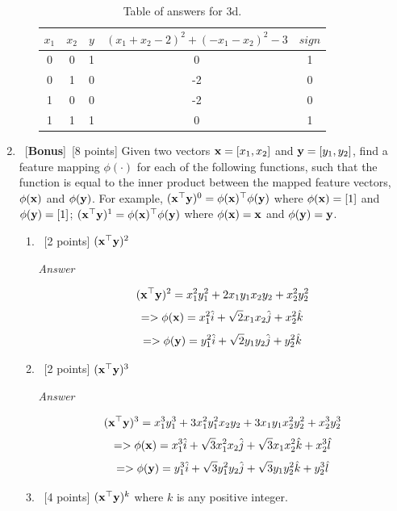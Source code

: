 \documentclass[12pt, fullpage,letterpaper]{article}
\begin{document}
\begin{enumerate}
\begin{enumerate}
		\begin{table}
        	\centering
        	\begin{tabular}{cccc|c}
        		$x_1 $ & $x_2$ & $y$ & $(x_1+x_2-2)^2+(-x_1-x_2)^2-3$ & $sign$\\ 
        		\hline\hline
        		0 & 0 & 1 &  0 & 1 \\ \hline
        		0 & 1 & 0 & -2 & 0 \\ \hline
        		1 & 0 & 0 & -2 & 0 \\ \hline
        		1 & 1 & 1 &  0 & 1 \\ \hline
        	\end{tabular}
        	\caption{Table of answers for 3d.}\label{tb:1}
        \end{table}
	\end{enumerate}
		
	
	\item~[\textbf{Bonus}]~[8 points]  Given two vectors ${\bf x} = [x_1,  x_2]$ and ${\bf y}=[y_1,  y_2]$, find a feature mapping $\phi(\cdot)$ for each of the following functions, such that the function is equal to the inner product between the mapped feature vectors, $\phi({\bf x})$ and $\phi({\bf y})$. For example, $({\bf x}^\top {\bf y})^0 = \phi({\bf x})^\top \phi({\bf y})$ where $\phi({\bf x}) = [1]$ and $\phi({\bf y}) = [1]$; $({\bf x}^\top {\bf y})^1 = \phi({\bf x})^\top \phi({\bf y})$ where $\phi({\bf x}) = {\bf x}$ and $\phi({\bf y}) = {\bf y}$. 
	\begin{enumerate}
		\item~[2 points] $({\bf x}^\top {\bf y})^2$
		
		\emph{Answer}
		
		\[
		    ({\bf x}^\top {\bf y})^2 = x_1^2y_1^2 + 2x_1y_1x_2y_2 + x_2^2y_2^2
		\]
		\[
            => \phi({\bf x}) = x_1^2\hat{i} + \sqrt{2}x_1x_2\hat{j} + x_2^2\hat{k}
        \]
		\[
            => \phi({\bf y}) = y_1^2\hat{i} + \sqrt{2}y_1y_2\hat{j} + y_2^2\hat{k}
        \]
        
        
		
		\item~[2 points] $({\bf x}^\top {\bf y})^3$
		
		\emph{Answer}
		
		\[
		    ({\bf x}^\top {\bf y})^3 = x_1^3y_1^3 + 3x_1^2y_1^2x_2y_2 + 3x_1y_1x_2^2y_2^2 + x_2^3y_2^3
		\]
		\[
            => \phi({\bf x}) = x_1^3\hat{i} + \sqrt{3}x_1^2x_2\hat{j} + \sqrt{3}x_1x_2^2\hat{k} + x_2^3\hat{l}
        \]
		\[
            => \phi({\bf y}) = y_1^3\hat{i} + \sqrt{3}y_1^2y_2\hat{j} + \sqrt{3}y_1y_2^2\hat{k} + y_2^3\hat{l}
        \]
        
		\item~[4 points] $({\bf x}^\top {\bf y})^k$ where $k$ is  any positive integer.  
		

\end{enumerate}
\end{enumerate}
\end{document}
